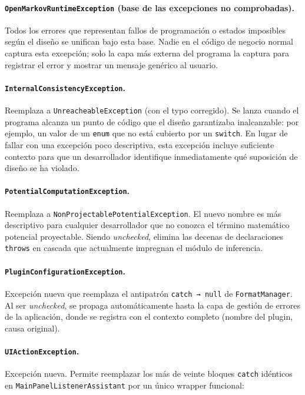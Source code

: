\documentclass[11pt,a4paper]{article}
\begin{document}
\paragraph{\texttt{OpenMarkovRuntimeException} (base de las excepciones no comprobadas).}
Todos los errores que representan fallos de programación o estados imposibles según el diseño
se unifican bajo esta base. Nadie en el código de negocio normal captura esta excepción; solo
la capa más externa del programa la captura para registrar el error y mostrar un mensaje
genérico al usuario.

\paragraph{\texttt{InternalConsistencyException}.}
Reemplaza a \texttt{UnreacheableException} (con el typo corregido). Se lanza cuando el
programa alcanza un punto de código que el diseño garantizaba inalcanzable: por ejemplo, un
valor de un \texttt{enum} que no está cubierto por un \texttt{switch}. En lugar de fallar con
una excepción poco descriptiva, esta excepción incluye suficiente contexto para que un
desarrollador identifique inmediatamente qué suposición de diseño se ha violado.

\paragraph{\texttt{PotentialComputationException}.}
Reemplaza a \texttt{NonProjectablePotentialException}. El nuevo nombre es más descriptivo para
cualquier desarrollador que no conozca el término matemático \guillemotleft potencial proyectable\guillemotright . Siendo
\textit{unchecked}, elimina las decenas de declaraciones \texttt{throws} en cascada que
actualmente impregnan el módulo de inferencia.

\paragraph{\texttt{PluginConfigurationException}.}
Excepción nueva que reemplaza el antipatrón \texttt{catch → null} de \texttt{FormatManager}.
Al ser \textit{unchecked}, se propaga automáticamente hasta la capa de gestión de errores de
la aplicación, donde se registra con el contexto completo (nombre del plugin, causa original).

\paragraph{\texttt{UIActionException}.}
Excepción nueva. Permite reemplazar los más
de veinte bloques \texttt{catch} idénticos en \texttt{MainPanelListenerAssistant} por un único
wrapper funcional:
\end{document}
